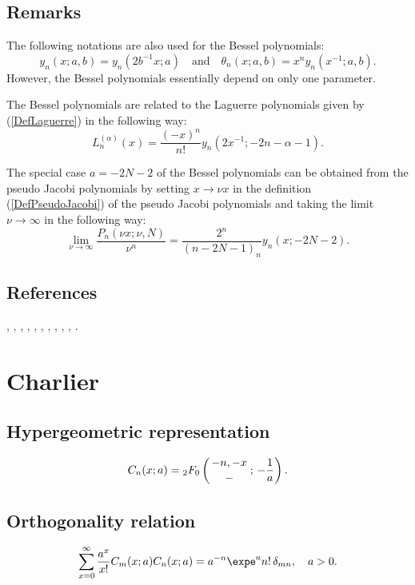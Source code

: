 \documentclass[envcountchap,graybox]{svmono}
\newcounter{rom}
\newcommand{\hyp}[5]{\mbox{}_{#1}{F}_{#2}
\left(\genfrac{}{}{0pt}{}{#3}{#4}\,;\,#5\right)}
\newcommand{\hyp}[5]{\,\mbox{}_{#1}F_{#2}\!\left(
  \genfrac{}{}{0pt}{}{#3}{#4};#5\right)}
\begin{document}
\subsection*{Remarks}
The following notations are also used for the Bessel polynomials:
$$y_n(x;a,b)=y_n(2b^{-1}x;a)\quad\textrm{and}\quad\theta_n(x;a,b)=x^ny_n(x^{-1};a,b).$$
However, the Bessel polynomials essentially depend on only one parameter.

\noindent
The Bessel polynomials are related to the Laguerre polynomials given by (\ref{DefLaguerre})
in the following way:
$$L_n^{(\alpha)}(x)=\frac{(-x)^n}{n!}y_n(2x^{-1};-2n-\alpha-1).$$

\noindent
The special case $a=-2N-2$ of the Bessel polynomials can be obtained from the pseudo Jacobi
polynomials by setting $x\rightarrow\nu x$ in the definition (\ref{DefPseudoJacobi}) of the
pseudo Jacobi polynomials and taking the limit $\nu\rightarrow\infty$ in the following way:
$$\lim\limits_{\nu\rightarrow\infty}\frac{P_n(\nu x;\nu,N)}{\nu^n}
=\frac{2^n}{(n-2N-1)_n}y_n(x;-2N-2).$$

\subsection*{References}
\cite{Andrade}, \cite{BergVignat}, \cite{Carlitz57I}, \cite{Dattoli2003},
\cite{DohaAhmed2004}, \cite{DohaAhmed2006}, \cite{Grosswald}, \cite{Ismail2005II},
\cite{KrallFrink}, \cite{Lesky98}, \cite{NikiforovUvarov}.


\section{Charlier}

\par\setcounter{equation}{0}

\subsection*{Hypergeometric representation}
\begin{equation}
\label{DefCharlier}
C_n(x;a)=\hyp{2}{0}{-n,-x}{-}{-\frac{1}{a}}.
\end{equation}

\subsection*{Orthogonality relation}
\begin{equation}
\label{OrtCharlier}
\sum_{x=0}^{\infty}\frac{a^x}{x!}C_m(x;a)C_n(x;a)=
a^{-n}\expe^an!\,\delta_{mn},\quad a > 0.
\end{equation}
\end{document}
